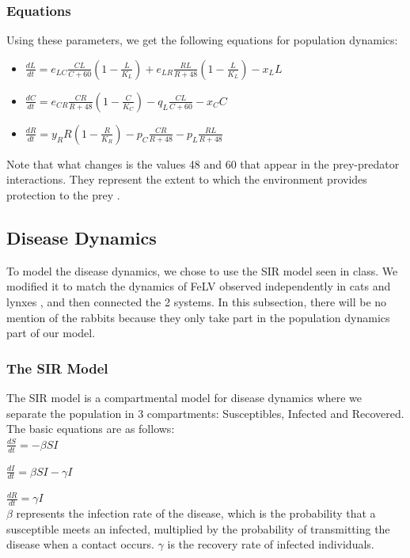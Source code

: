 \documentclass[12pt]{article}
\begin{document}
\subsubsection{Equations}
\quad Using these parameters, we get the following equations for population dynamics:
\begin{itemize}
    \item $\frac{dL}{dt} = e_{LC}\frac{CL}{C + 60}(1 - \frac{L}{K_{L}}) + e_{LR}\frac{RL}{R + 48}(1 - \frac{L}{K_{L}}) - x_{L}L$
    \item $\frac{dC}{dt} = e_{CR}\frac{CR}{R + 48}(1 - \frac{C}{K_{C}}) - q_{L}\frac{CL}{C + 60} - x_{C}C$
    \item $\frac{dR}{dt} = y_{R}R(1 - \frac{R}{K_{R}}) - p_{C}\frac{CR}{R + 48} - p_{L}\frac{RL}{R + 48}$
\end{itemize}
\quad Note that what changes is the values 48 and 60 that appear in the prey-predator interactions. They represent the extent to which the environment provides protection to the prey \cite{wave_of_chaos}.

\subsection{Disease Dynamics}
\quad To model the disease dynamics, we chose to use the SIR model seen in class. We modified it to match the dynamics of FeLV observed independently in cats \cite{fromont_modelling_1997} and lynxes \cite{meli_feline_2010}, and then connected the 2 systems. In this subsection, there will be no mention of the rabbits because they only take part in the population dynamics part of our model.
\subsubsection{The SIR Model}
\quad The SIR model is a compartmental model for disease dynamics where we separate the population in 3 compartments: Susceptibles, Infected and Recovered. The basic equations are as follows: \\

$\frac{dS}{dt} = -\beta SI$

$\frac{dI}{dt} = \beta SI - \gamma I$

$\frac{dR}{dt} = \gamma I$\\


\quad $\beta$ represents the infection rate of the disease, which is the probability that a susceptible meets an infected, multiplied by the probability of transmitting the disease when a contact occurs. $\gamma$ is the recovery rate of infected individuals.
\end{document}
